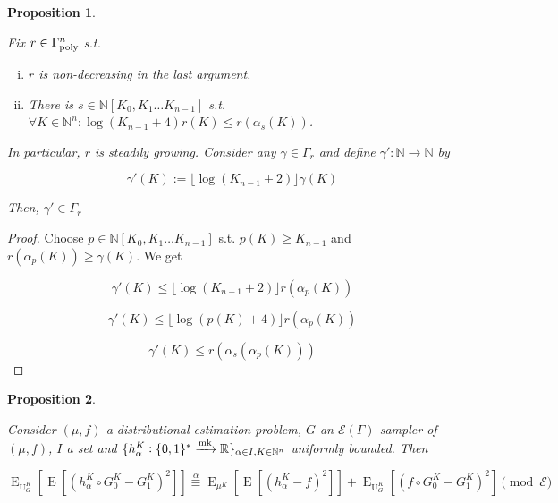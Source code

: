\documentclass{article}
\numberwithin{equation}{section}
\theoremstyle{definition}
\theoremstyle{plain}
\newtheorem{proposition}{Proposition}[section]
\newcommand{\Bool}{\{0,1\}}
\newcommand{\Words}{{\Bool^*}}
\DeclareMathOperator{\E}{E}
\DeclareMathOperator{\Un}{U}
\newcommand{\Nats}{\mathbb{N}}
\newcommand{\Reals}{\mathbb{R}}
\newcommand{\NatPoly}{\Nats[K_0, K_1 \ldots K_{n-1}]}
\newcommand{\Floor}[1]{\lfloor #1 \rfloor}
\newcommand{\Fall}{\mathcal{E}}
\newcommand{\EG}{\Fall(\Gamma)}
\newcommand{\GammaPoly}{\Gamma_{\textnormal{poly}}}
\newcommand{\Markov}{\xrightarrow{\textnormal{mk}}}
\begin{document}
\begin{samepage}
\begin{proposition}
\label{prp:std_grow_log}

Fix ${r \in \GammaPoly^n}$ s.t.

\begin{enumerate}[(i)]

\item ${r}$ is non-decreasing in the last argument.

\item There is ${s \in \NatPoly}$ s.t. ${\forall K \in \Nats^n: \log(K_{n-1}+4)r(K) \leq r(\alpha_s(K))}$.

\end{enumerate}

In particular, ${r}$ is steadily growing. Consider any ${\gamma \in \Gamma_r}$ and define ${\gamma': \Nats \rightarrow \Nats}$ by 

\[\gamma'(K):=\Floor{\log(K_{n-1}+2)}\gamma(K)\]

Then, ${\gamma' \in \Gamma_r}$

\end{proposition}
\end{samepage}

\begin{proof}

Choose ${p \in \NatPoly}$ s.t. ${p(K) \geq K_{n-1}}$ and ${r(\alpha_p(K)) \geq \gamma(K)}$. We get 

\[\gamma'(K) \leq \Floor{\log(K_{n-1}+2)} r(\alpha_p(K))\]

\[\gamma'(K) \leq \Floor{\log(p(K)+4)} r(\alpha_p(K))\]

\[\gamma'(K) \leq r(\alpha_s(\alpha_p(K)))\]
%
\end{proof}

\begin{samepage}
\begin{proposition}
\label{prp:est_err_smp}

Consider ${(\mu,f)}$ a distributional estimation problem, ${G}$ an ${\EG}$-sampler of ${(\mu,f)}$, ${I}$ a set and ${\{h_\alpha^K: \Words \Markov \Reals\}_{\alpha \in I, K \in \Nats^n}}$ uniformly bounded. Then

\begin{equation}
\label{eqn:prp__est_err_smp}
\E_{\Un_G^K}[\E[(h_\alpha^K \circ G^K_0-G^K_1)^2]] \overset{\alpha}{\equiv} \E_{\mu^K}[\E[(h_\alpha^K-f)^2]] + \E_{\Un_G^K}[(f \circ G^K_0-G^K_1)^2] \pmod \Fall
\end{equation}

\end{proposition}
\end{samepage}
\end{document}
